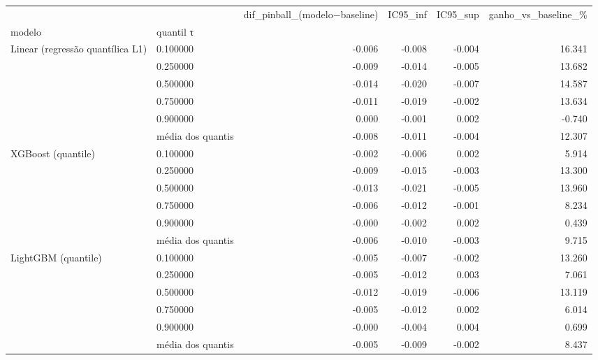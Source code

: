 \begin{tabular}{llrrrr}
\toprule
 &  & dif\_pinball\_(modelo−baseline) & IC95\_inf & IC95\_sup & ganho\_vs\_baseline\_\% \\
modelo & quantil τ &  &  &  &  \\
\midrule
\multirow[t]{6}{*}{Linear (regressão quantílica L1)} & 0.100000 & -0.006 & -0.008 & -0.004 & 16.341 \\
 & 0.250000 & -0.009 & -0.014 & -0.005 & 13.682 \\
 & 0.500000 & -0.014 & -0.020 & -0.007 & 14.587 \\
 & 0.750000 & -0.011 & -0.019 & -0.002 & 13.634 \\
 & 0.900000 & 0.000 & -0.001 & 0.002 & -0.740 \\
 & média dos quantis & -0.008 & -0.011 & -0.004 & 12.307 \\
\cline{1-6}
\multirow[t]{6}{*}{XGBoost (quantile)} & 0.100000 & -0.002 & -0.006 & 0.002 & 5.914 \\
 & 0.250000 & -0.009 & -0.015 & -0.003 & 13.300 \\
 & 0.500000 & -0.013 & -0.021 & -0.005 & 13.960 \\
 & 0.750000 & -0.006 & -0.012 & -0.001 & 8.234 \\
 & 0.900000 & -0.000 & -0.002 & 0.002 & 0.439 \\
 & média dos quantis & -0.006 & -0.010 & -0.003 & 9.715 \\
\cline{1-6}
\multirow[t]{6}{*}{LightGBM (quantile)} & 0.100000 & -0.005 & -0.007 & -0.002 & 13.260 \\
 & 0.250000 & -0.005 & -0.012 & 0.003 & 7.061 \\
 & 0.500000 & -0.012 & -0.019 & -0.006 & 13.119 \\
 & 0.750000 & -0.005 & -0.012 & 0.002 & 6.014 \\
 & 0.900000 & -0.000 & -0.004 & 0.004 & 0.699 \\
 & média dos quantis & -0.005 & -0.009 & -0.002 & 8.437 \\
\cline{1-6}
\bottomrule
\end{tabular}
